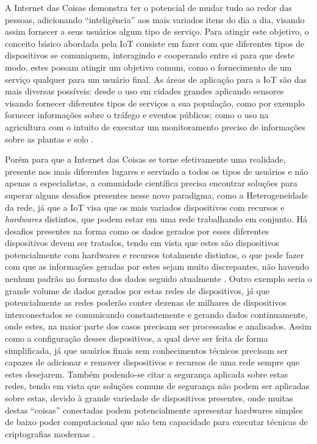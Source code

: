 \documentclass[ti,table]{texufpel} %
\begin{document}
A Internet das Coisas demonstra ter o potencial de mudar tudo ao redor das pessoas, adicionando ``inteligência'' aos mais variados itens do dia a dia, visando assim fornecer a seus usuários algum tipo de serviço. Para atingir este objetivo, o conceito básico abordada pela IoT consiste em fazer com que diferentes tipos de dispositivos se comuniquem, interagindo e cooperando entre si para que deste modo, estes possam atingir um objetivo comum, como o fornecimento de um serviço qualquer para um usuário final. As áreas de aplicação para a IoT são das mais diversas possíveis: desde o uso em cidades grandes aplicando sensores visando fornecer diferentes tipos de serviços a sua população, como por exemplo fornecer informações sobre o tráfego e eventos públicos; como o uso na agricultura com o intuito de executar um monitoramento preciso de  informações sobre as plantas e solo \cite{gonccalves2017research}. 

  

Porém para que a Internet das Coisas se torne efetivamente uma realidade, presente nos mais diferentes lugares e servindo a todos os tipos de usuários e não apenas a especialistas, a comunidade científica precisa encontrar soluções para superar alguns desafios presentes nesse novo paradigma, como a Heterogeneidade da rede, já que a IoT visa que os mais variados dispositivos com recursos e \textit{hardwares} distintos, que podem estar em uma rede trabalhando em conjunto. Há desafios presentes na forma como os dados gerados por esses diferentes dispositivos devem ser tratados, tendo em vista que estes são dispositivos potencialmente com hardwares e recursos totalmente distintos, o que pode fazer com que as informações geradas por estes sejam muito discrepantes, não havendo nenhum padrão no formato dos dados seguido atualmente \cite{agrawal2013survey}. Outro exemplo seria o grande volume de dados gerados por estas redes de dispositivos, já que potencialmente as redes poderão conter dezenas de milhares de dispositivos interconectados se comunicando constantemente e gerando dados continuamente, onde estes, na maior parte dos casos precisam ser processados e analisados. Assim como a configuração desses dispositivos, a qual deve ser feita de forma simplificada, já que usuários finais sem conhecimentos técnicos precisam ser capazes de adicionar e remover dispositivos e recursos de uma rede sempre que estes desejarem. Também podendo-se citar a segurança aplicada sobre estas redes, tendo em vista que soluções comuns de segurança não podem ser aplicadas sobre estas,  devido à grande variedade de dispositivos presentes, onde muitas destas ``coisas'' conectadas podem potencialmente apresentar hardwares simples de baixo poder computacional que não tem capacidade para executar técnicas de criptografias modernas \cite{agrawal2013survey}.
\end{document}
